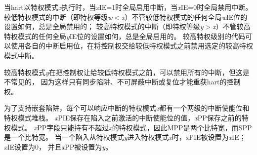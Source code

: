 \iffalse
When a hart is executing in privilege mode {\em x}, interrupts are
globally enabled when {\em x}\/IE=1 and globally disabled when {\em
  x}\/IE=0.  Interrupts for lower-privilege modes, {\em w}$<${\em x},
are always globally disabled regardless of the setting of any global
{\em w}\/IE bit for the lower-privilege mode.
Interrupts for
higher-privilege modes, {\em y}$>${\em x}, are always globally enabled
regardless of the setting of the global {\em y}\/IE bit for the
higher-privilege mode.
Higher-privilege-level code can use separate
per-interrupt enable bits to disable selected higher-privilege-mode
interrupts before ceding control to a lower-privilege mode.
\fi

当hart以特权模式{\em x}执行时，当{\em x}\/IE=1时全局启用中断，当{\em x}\/IE=0时全局禁用中断。
较低特权模式的中断（即特权等级{\em w}$<${\em x}）不管较低特权模式的任何全局{\em w}\/IE位的设置如何，总是全局禁用的；
较高特权模式的中断（即特权等级{\em y}$>${\em x}）不管较高特权模式的任何全局{\em y}\/IE位的设置如何，总是全局启用的。
较高特权级别的代码可以使用各自的中断启用位，在将控制权交给较低特权模式之前禁用选定的较高特权模式中断。

\iffalse
\begin{commentary}
  A higher-privilege mode {\em y} could disable all of its interrupts
  before ceding control to a lower-privilege mode but this would be
  unusual as it would leave only a synchronous trap, non-maskable
  interrupt, or reset as means to regain control of the hart.
\end{commentary}
\fi

\begin{commentary}
较高特权模式{\em y}在把控制权让给较低特权模式之前，可以禁用所有的中断，但这是不常见的，
因为这样只有同步陷阱、不可屏蔽中断或复位才能重获hart的控制权。
\end{commentary}

\iffalse
To support nested traps, each privilege mode {\em x} that can respond to
interrupts has a two-level
stack of interrupt-enable bits and privilege modes.  {\em x}\/PIE
holds the value of the interrupt-enable bit active prior to the trap,
and {\em x}\/PP holds the previous privilege mode.  The {\em x}\/PP
fields can only hold privilege modes up to {\em x}, so MPP is
two bits wide and SPP is one bit wide.  When
a trap is taken from privilege mode {\em y} into privilege mode {\em
  x}, {\em x}\/PIE is set to the value of {\em x}\/IE; {\em x}\/IE is set to
0; and {\em x}\/PP is set to {\em y}.
\fi

为了支持嵌套陷阱，每个可以响应中断的特权模式{\em x}都有一个两级的中断使能位和特权模式堆栈。
{\em x}\/PIE保存在陷入之前激活的中断使能位的值，{\em x}\/PP保存之前的特权模式。
{\em x}\/PP字段只能持有不超过{\em x}的特权模式，因此MPP是两个比特宽，而SPP是一个比特宽。
当一个陷入从特权模式{\em y}进入特权模式{\em x}时，{\em x}\/PIE被设置为{\em x}\/IE；{\em x}\/IE设置为0，
并且{\em x}\/PP被设置为{\em y}。

